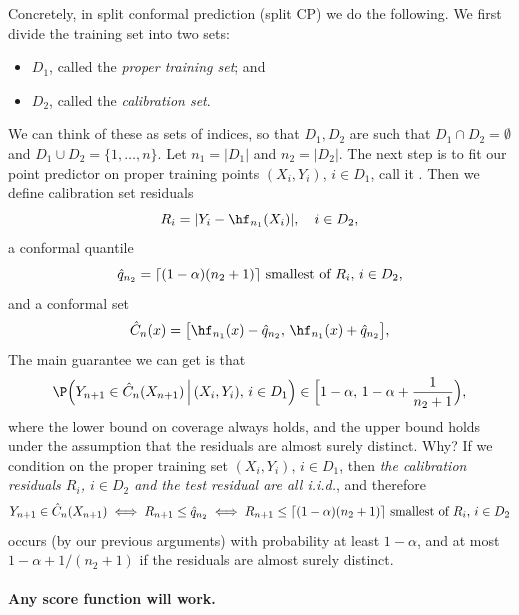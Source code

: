 \documentclass{article}
\begin{document}
Concretely, in split conformal prediction (split CP) we do the following. We
first divide the training set into two sets:   
\begin{itemize}
\item $D_1$, called the \emph{proper training set}; and
\item $D_2$, called the \emph{calibration set}.
\end{itemize}
We can think of these as sets of indices, so that $D_1,D_2$ are such that $D_1 
\cap D_2 = \emptyset$ and $D_1 \cup D_2 = \{1,\dots,n\}$. Let $n_1 = |D_1|$ and
$n_2 = |D_2|$. The next step is to fit our point predictor on proper training
points $(X_i,Y_i)$, $i \in D_1$, call it . Then we define 
calibration set residuals  
\[
R_i = |Y_i - \hf_{n_1}(X_i)|, \quad i \in D_2,
\]
a conformal quantile
\[
\text{$\hat{q}_{n_2} = \lceil (1-\alpha)(n_2+1) \rceil$ smallest of $R_i$, $i \in
  D_2$},
\]
and a conformal set
\begin{equation}
\label{eq:cset_split}
\hC_n(x) = \big[ \hf_{n_1}(x) - \hq_{n_2}, \, \hf_{n_1}(x) + \hq_{n_2} \big],  
\end{equation}
The main guarantee we can get is that 
\begin{equation}
\label{eq:coverage_split}
\P\Big( Y_{n+1} \in \hC_n(X_{n+1}) \, \Big| \, (X_i,Y_i), \, i \in D_1 \Big) \in 
\Big[ 1-\alpha, \, 1-\alpha + \frac{1}{n_2+1} \Big),  
\end{equation}
where the lower bound on coverage always holds, and the upper bound holds under
the assumption that the residuals are almost surely distinct. Why? If we
condition on the proper training set $(X_i,Y_i)$, $i \in D_1$, then \emph{the
  calibration residuals $R_i$, $i \in D_2$ and the test residual  are all i.i.d.}, and therefore  
\[
Y_{n+1} \in \hat{C}_n(X_{n+1}) 
\iff R_{n+1} \leq \hat{q}_{n_2}  
\iff \text{$R_{n+1} \leq \lceil (1-\alpha)(n_2+1) \rceil$ smallest of $R_i$, $i 
  \in D_2$}  
\]
occurs (by our previous arguments) with probability at least $1-\alpha$, and at
most $1-\alpha+1/(n_2+1)$ if the residuals are almost surely distinct. 

\paragraph{Any score function will work.}
\end{document}
